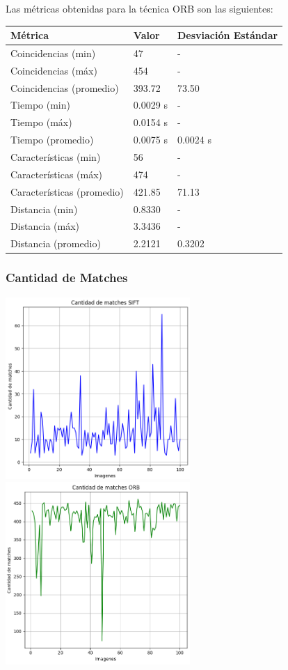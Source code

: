 \documentclass[unnumsec,webpdf,modern,large]{mam-authoring-template}
\theoremstyle{thmstyleone}%
\theoremstyle{thmstyletwo}%
\theoremstyle{thmstylethree}%
\begin{document}
Las métricas obtenidas para la técnica ORB son las siguientes:

\begin{center}
\begin{tabular}{ | m{7em} | m{1.5cm} | m{1.5cm} | } 
  \hline
  \textbf{Métrica} & \textbf{Valor} & \textbf{Desviación Estándar} \\ 
  \hline
  Coincidencias (min) & 47 & - \\ 
  \hline
  Coincidencias (máx) & 454 & - \\ 
  \hline
  Coincidencias (promedio) & 393.72 & 73.50 \\ 
  \hline
  Tiempo (min) & 0.0029 s & - \\ 
  \hline
  Tiempo (máx) & 0.0154 s & - \\ 
  \hline
  Tiempo (promedio) & 0.0075 s & 0.0024 s \\ 
  \hline
  Características (min) & 56 & - \\ 
  \hline
  Características (máx) & 474 & - \\ 
  \hline
  Características (promedio) & 421.85 & 71.13 \\ 
  \hline
  Distancia (min) & 0.8330 & - \\ 
  \hline
  Distancia (máx) & 3.3436 & - \\ 
  \hline
  Distancia (promedio) & 2.2121 & 0.3202 \\ 
  \hline
\end{tabular}
\end{center}


\subsubsection{Cantidad de Matches}
\includegraphics[width=7cm]{1.png}
\includegraphics[width=7cm]{1.1.1.png}
\end{document}
